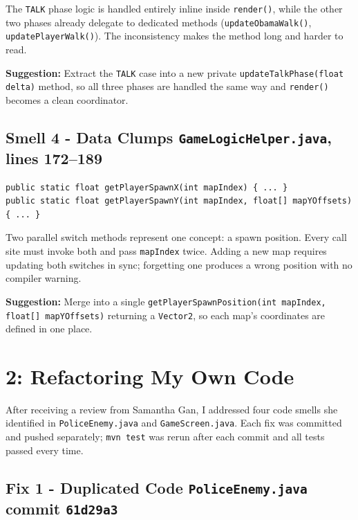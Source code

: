 \documentclass[10pt]{article}
\begin{document}
The \texttt{TALK} phase logic is handled entirely inline inside \texttt{render()}, while the other two phases already delegate to dedicated methods (\texttt{updateObamaWalk()}, \texttt{updatePlayerWalk()}). The inconsistency makes the method long and harder to read.

\textbf{Suggestion:} Extract the \texttt{TALK} case into a new private \texttt{updateTalkPhase(float delta)} method, so all three phases are handled the same way and \texttt{render()} becomes a clean coordinator.

\subsection*{Smell 4 - Data Clumps \quad \normalfont\texttt{GameLogicHelper.java}, lines 172--189}

\begin{lstlisting}
public static float getPlayerSpawnX(int mapIndex) { ... }
public static float getPlayerSpawnY(int mapIndex, float[] mapYOffsets) { ... }
\end{lstlisting}

Two parallel switch methods represent one concept: a spawn position. Every call site must invoke both and pass \texttt{mapIndex} twice. Adding a new map requires updating both switches in sync; forgetting one produces a wrong position with no compiler warning.

\textbf{Suggestion:} Merge into a single \texttt{getPlayerSpawnPosition(int mapIndex, float[] mapYOffsets)} returning a \texttt{Vector2}, so each map's coordinates are defined in one place.

\section*{2: Refactoring My Own Code}

After receiving a review from Samantha Gan, I addressed four code smells she identified in \texttt{PoliceEnemy.java} and \texttt{GameScreen.java}. Each fix was committed and pushed separately; \texttt{mvn test} was rerun after each commit and all tests passed every time.

\subsection*{Fix 1 - Duplicated Code \quad \normalfont\texttt{PoliceEnemy.java} \hfill commit \texttt{61d29a3}}
\end{document}
